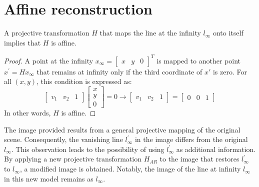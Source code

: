 \section{Affine reconstruction}

\begin{theorem}
    A projective transformation $H$ that maps the line at the infinity $l_{\infty}$ onto itself implies that $H$ is affine. 
\end{theorem}
\begin{proof}
    A point at the infinity $x_{\infty}={\begin{bmatrix} x & y & 0 \end{bmatrix}^T}$ is mapped to another point $x^{'}=Hx_{\infty}$ that remains at infinity only if the third coordinate of $x'$ is zero.
    For all $(x,y)$, this condition is expressed as:
    \[\begin{bmatrix} v_1 & v_2 & 1 \end{bmatrix} \begin{bmatrix} x \\ y \\ 0 \end{bmatrix}=0 \rightarrow \begin{bmatrix} v_1 & v_2 & 1 \end{bmatrix} = \begin{bmatrix} 0 & 0 & 1 \end{bmatrix}\]
    In other words, $H$ is affine.
\end{proof}
The image provided results from a general projective mapping of the original scene. 
Consequently, the vanishing line $l^{'}_{\infty}$ in the image differs from the original $l_{\infty}$. 
This observation leads to the possibility of using $l^{'}_{\infty}$ as additional information.
By applying a new projective transformation $H_{AR}$ to the image that restores $l^{'}_{\infty}$ to $l_{\infty}$, a modified image is obtained.
Notably, the image of the line at infinity $l_{\infty}$ in this new model remains as $l_{\infty}$. 

